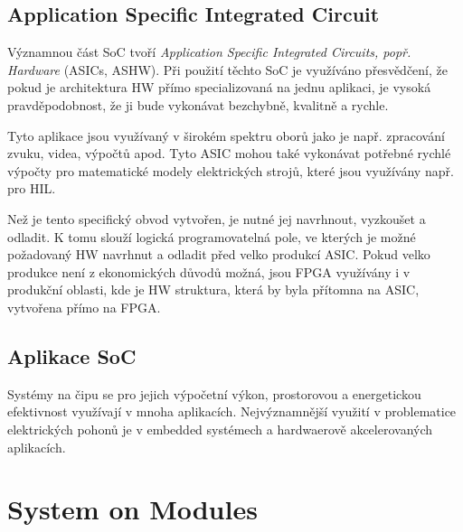 \documentclass[a4paper, twoside, 11pt]{article}
\begin{document}
	\subsection{Application Specific Integrated Circuit}
		Významnou část SoC tvoří \textit{Application Specific Integrated Circuits, popř. Hardware} (ASICs, ASHW). Při použití těchto SoC je využíváno přesvědčení, že pokud je architektura HW přímo specializovaná na jednu aplikaci, je vysoká pravděpodobnost, že ji bude vykonávat bezchybně, kvalitně a rychle.\par
		Tyto aplikace jsou využívaný v širokém spektru oborů jako je např. zpracování zvuku, videa, výpočtů apod. Tyto ASIC mohou také vykonávat potřebné rychlé výpočty pro matematické modely elektrických strojů, které jsou využívány např. pro HIL.\par
		Než je tento specifický obvod vytvořen, je nutné jej navrhnout, vyzkoušet a odladit. K tomu slouží logická programovatelná pole, ve kterých je možné požadovaný HW navrhnut a odladit před velko produkcí ASIC. Pokud velko produkce není z ekonomických důvodů možná, jsou FPGA využívány i v produkční oblasti, kde je HW struktura, která by byla přítomna na ASIC, vytvořena přímo na FPGA.


	\subsection{Aplikace SoC}
	Systémy na čipu se pro jejich výpočetní výkon, prostorovou a energetickou efektivnost využívají v mnoha aplikacích. Nejvýznamnější využití v problematice elektrických pohonů je v embedded systémech a hardwaerově akcelerovaných aplikacích.

	\section{System on Modules}
\end{document}
